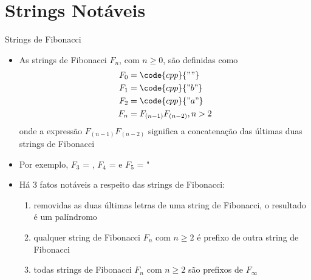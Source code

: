 \section{Strings Notáveis}

\begin{frame}[fragile]{Strings de Fibonacci}

    \begin{itemize}
        \item As strings de Fibonacci $F_n$, com $n \geq 0$, são definidas como
        \begin{align*}
            F_0 &= \code{cpp}{""} \\
            F_1 &= \code{cpp}{"b"} \\
            F_2 &=  \code{cpp}{"a"} \\
            F_n &= F_{(n-1)}F_{(n-2)}, n > 2
            \end{align*}
        onde a expressão $F_{(n-1)}F_{(n-2)}$ significa a concatenação das últimas duas strings de 
        Fibonacci
        \pause

        \item Por exemplo, $F_3$ = , $F_4$ =   e $F_5$ = "
        \pause

        \item Há 3 fatos notáveis a respeito das strings de Fibonacci:
        \pause
        \begin{enumerate}
            \item removidas as duas últimas letras de uma string de Fibonacci, o resultado é um 
                palíndromo
        \pause
            \item qualquer string de Fibonacci $F_n$ com $n\geq 2$ é prefixo de outra string de Fibonacci
        \pause
            \item todas strings de Fibonacci $F_n$ com $n\geq 2$ são prefixos de $F_\infty$
        \end{enumerate}

    \end{itemize}

\end{frame}

